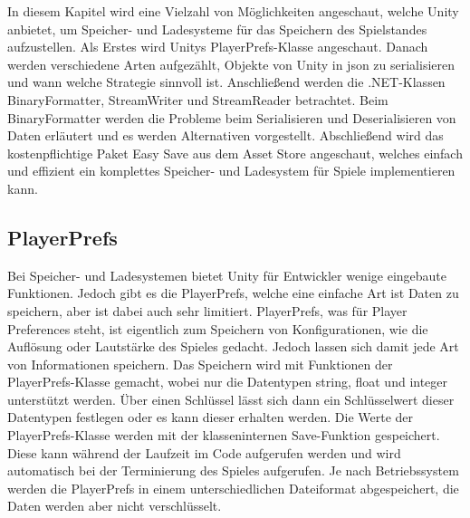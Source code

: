 In diesem Kapitel wird eine Vielzahl von Möglichkeiten angeschaut, welche Unity anbietet, um Speicher- und Ladesysteme für das Speichern des Spielstandes aufzustellen. Als Erstes wird Unitys PlayerPrefs-Klasse angeschaut. Danach werden verschiedene Arten aufgezählt, Objekte von Unity in \ac{json} zu serialisieren und wann welche Strategie sinnvoll ist. Anschließend werden die .NET-Klassen BinaryFormatter, StreamWriter und StreamReader betrachtet. Beim BinaryFormatter werden die Probleme beim Serialisieren und Deserialisieren von Daten erläutert und es werden Alternativen vorgestellt. Abschließend wird das kostenpflichtige Paket Easy Save aus dem Asset Store angeschaut, welches einfach und effizient ein komplettes Speicher- und Ladesystem für Spiele implementieren kann.



\subsection{PlayerPrefs}
Bei Speicher- und Ladesystemen bietet Unity für Entwickler wenige eingebaute Funktionen. Jedoch gibt es die PlayerPrefs, welche eine einfache Art ist Daten zu speichern, aber ist dabei auch sehr limitiert. PlayerPrefs, was für Player Preferences steht, ist eigentlich zum Speichern von Konfigurationen, wie die Auflösung oder Lautstärke des Spieles gedacht. Jedoch lassen sich damit jede Art von Informationen speichern. Das Speichern wird mit Funktionen der PlayerPrefs-Klasse gemacht, wobei nur die Datentypen string, float und integer unterstützt werden. Über einen Schlüssel lässt sich dann ein Schlüsselwert dieser Datentypen festlegen oder es kann dieser erhalten werden. Die Werte der PlayerPrefs-Klasse werden mit der klasseninternen Save-Funktion gespeichert. Diese kann während der Laufzeit im Code aufgerufen werden und wird automatisch bei der Terminierung des Spieles aufgerufen.\cite{unityPlayerPrefsSave} Je nach Betriebssystem werden die PlayerPrefs in einem unterschiedlichen Dateiformat abgespeichert, die Daten werden aber nicht verschlüsselt.\cite{unityPlayerPrefs}

